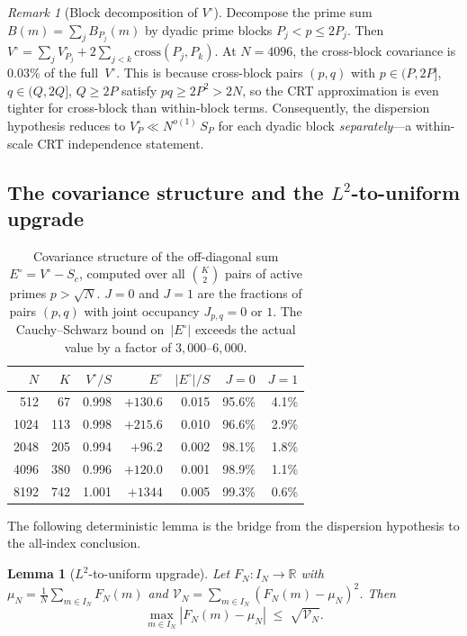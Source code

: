 \documentclass[11pt]{article}
\newtheorem{lemma}[theorem]{Lemma}
\theoremstyle{definition}
\theoremstyle{remark}
\newtheorem{remark}[theorem]{Remark}
\begin{document}
\begin{remark}[Block decomposition of $V^\circ$]
\label{rem:block-decomp}
Decompose the prime sum $B(m) = \sum_j B_{P_j}(m)$
by dyadic prime blocks $P_j < p \le 2P_j$.
Then $V^\circ = \sum_j V^\circ_{P_j}
+ 2 \sum_{j < k} \text{cross}(P_j, P_k)$.
At $N = 4096$, the cross-block covariance is
$0.03\%$ of the full~$V^\circ$.
This is because cross-block pairs $(p,q)$
with $p \in (P,2P]$, $q \in (Q,2Q]$, $Q \ge 2P$
satisfy $pq \ge 2P^2 > 2N$, so the CRT
approximation is even tighter for cross-block
than within-block terms.
Consequently, the dispersion hypothesis
reduces to $V^\circ_P \ll N^{o(1)}\,S_P$ for
each dyadic block \emph{separately}---a
within-scale CRT independence statement.
\end{remark}

\subsection{The covariance structure and the $L^2$-to-uniform upgrade}

\begin{table}[ht]
\centering
\begin{tabular}{rrrrrrr}
\hline
$N$ & $K$ & $V^\circ/S$ & $E^\circ$ & $|E^\circ|/S$ & $J{=}0$ & $J{=}1$ \\
\hline
512  & 67  & 0.998 & $+130.6$ & 0.015 & 95.6\% & 4.1\% \\
1024 & 113 & 0.998 & $+215.6$ & 0.010 & 96.6\% & 2.9\% \\
2048 & 205 & 0.994 & $+96.2$  & 0.002 & 98.1\% & 1.8\% \\
4096 & 380 & 0.996 & $+120.0$ & 0.001 & 98.9\% & 1.1\% \\
8192 & 742 & 1.001 & $+1344$  & 0.005 & 99.3\% & 0.6\% \\
\hline
\end{tabular}
\caption{Covariance structure of the off-diagonal sum $E^\circ = V^\circ - S_c$,
computed over all $\binom{K}{2}$ pairs of active primes $p > \sqrt{N}$.
$J{=}0$ and $J{=}1$ are the fractions of pairs $(p,q)$ with
joint occupancy $J_{p,q} = 0$ or $1$.
The Cauchy--Schwarz bound on~$|E^\circ|$ exceeds
the actual value by a factor of $3{,}000$--$6{,}000$.}
\label{tab:covariance}
\end{table}

The following deterministic lemma is the bridge from the dispersion
hypothesis to the all-index conclusion.

\begin{lemma}[$L^2$-to-uniform upgrade]\label{lem:l2-uniform}
Let $F_N \colon I_N \to \mathbb{R}$ with
$\mu_N = \frac{1}{N}\sum_{m \in I_N} F_N(m)$ and
$\mathcal{V}_N = \sum_{m \in I_N}(F_N(m) - \mu_N)^2$.
Then
\begin{equation}\label{eq:l2-uniform}
  \max_{m \in I_N} |F_N(m) - \mu_N| \;\le\; \sqrt{\mathcal{V}_N}.
\end{equation}
\end{lemma}
\end{document}
